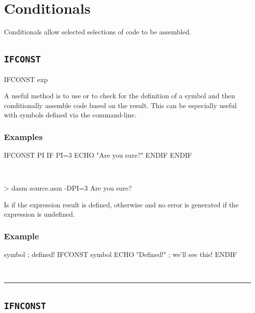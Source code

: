 	
\section{Conditionals}
\label{conditionals}


Conditionals allow selected selections of code to be assembled.\\


\subsection{\texttt{IFCONST}}
\label{pseudoop:ifconst}

\begin{usage}
  IFCONST exp
\end{usage}

A useful method is to use  or  to check for the definition of a symbol and then conditionally assemble code based on the result. This can be especially useful with symbols defined via the command-line.

\subsubsection{Examples}

\begin{code}
  IFCONST PI
    IF PI=3
      ECHO "Are you sure?"
    ENDIF
  ENDIF
\end{code}\\

\begin{outputx}
> dasm source.asm -DPI=3
Are you sure?
\end{outputx}


Is  if the expression result is defined,  otherwise
and no error is generated if the expression is undefined.

\subsubsection{Example}
\begin{code}
symbol  ; defined!
    IFCONST symbol
        ECHO "Defined!"  ; we'll see this!
    ENDIF
\end{code}\\

\hrule
\subsection{\texttt{IFNCONST}}
\label{pseudoop:ifnconst}

